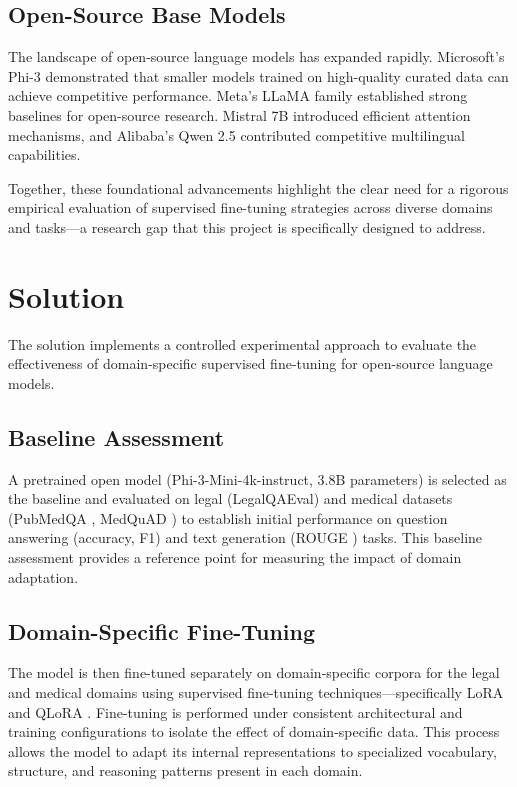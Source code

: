 \documentclass[12pt, letterpaper]{article}
\begin{document}
\subsection{Open-Source Base Models}

The landscape of open-source language models has expanded rapidly. Microsoft's Phi-3 \citep{abdin2024phi3} demonstrated that smaller models trained on high-quality curated data can achieve competitive performance. Meta's LLaMA family \citep{touvron2023llama} established strong baselines for open-source research. Mistral 7B \citep{jiang2023mistral} introduced efficient attention mechanisms, and Alibaba's Qwen 2.5 \citep{qwen2024qwen25} contributed competitive multilingual capabilities.

Together, these foundational advancements highlight the clear need for a rigorous empirical evaluation of supervised fine-tuning strategies across diverse domains and tasks---a research gap that this project is specifically designed to address.

\section{Solution}
\label{sec:solution}

The solution implements a controlled experimental approach to evaluate the effectiveness of domain-specific supervised fine-tuning for open-source language models.

\subsection{Baseline Assessment}

A pretrained open model (Phi-3-Mini-4k-instruct, 3.8B parameters) is selected as the baseline and evaluated on legal (LegalQAEval) and medical datasets (PubMedQA \citep{jin2019pubmedqa}, MedQuAD \citep{abacha2019medquad}) to establish initial performance on question answering (accuracy, F1) and text generation (ROUGE \citep{lin2004rouge}) tasks. This baseline assessment provides a reference point for measuring the impact of domain adaptation.

\subsection{Domain-Specific Fine-Tuning}

The model is then fine-tuned separately on domain-specific corpora for the legal and medical domains using supervised fine-tuning techniques---specifically LoRA \citep{hu2022lora} and QLoRA \citep{dettmers2023qlora}. Fine-tuning is performed under consistent architectural and training configurations to isolate the effect of domain-specific data. This process allows the model to adapt its internal representations to specialized vocabulary, structure, and reasoning patterns present in each domain.
\end{document}
